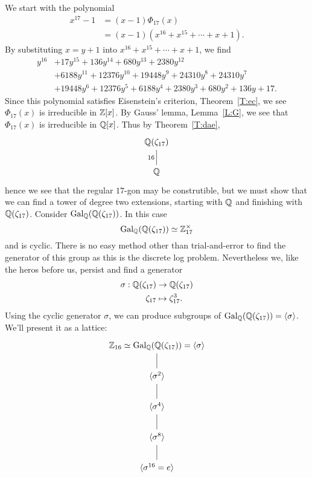 \documentclass{ximera}
\begin{document}
\begin{example}
  We start with the polynomial
  \begin{align*}
    x^{17} -1 &= (x-1) \Phi_{17}(x)\\
    &= (x-1)(x^{16} + x^{15} + \cdots + x+1).
  \end{align*}
  By substituting $x=y+1$ into $x^{16} + x^{15} + \cdots + x+1$, we find
  \begin{align*}
  y^{16} &+17 y^{15}+136 y^{14}+680 y^{13}+2380 y^{12} \\
  &+6188 y^{11}+12376 y^{10}+19448 y^9+24310 y^8+24310 y^7\\
  &+19448 y^6+12376 y^5+6188 y^4+2380 y^3+680 y^2+136 y+17.
  \end{align*}
  Since this polynomial satisfies Eisenstein's criterion,
  Theorem~\ref{T:ec}, we see $\Phi_{17}(x)$ is irreducible in
  $\mathbb Z[x]$. By Gauss' lemma, Lemma~\ref{L:G}, we see that $\Phi_{17}(x)$ is irreducible in
  $\mathbb Q[x]$. Thus by Theorem~\ref{T:dae}, 
  \[
  \begin{tikzcd}
    \Q(\zeta_{17})\\
    \Q\ar[u, -, "16"]
  \end{tikzcd}
  \]
  hence we see that the regular $17$-gon may be construtible, but we
  must show that we can find a tower of degree two extensions,
  starting with $\mathbb Q$ and finishing with $\mathbb Q(\zeta_{17})$.  Consider
  $\operatorname{Gal}_{\mathbb Q}(\mathbb Q(\zeta_{17}))$. In this case
  \[
  \operatorname{Gal}_{\mathbb Q}(\mathbb Q(\zeta_{17}))\simeq \mathbb Z_{17}^\times
  \]
  and is cyclic. There is no easy method other than trial-and-error to
  find the generator of this group as this is the discrete log
  problem. Nevertheless we, like the
  heros before us, persist and find a generator
  \begin{align*}
  \sigma:\mathbb Q(\zeta_{17}) &\to \mathbb Q(\zeta_{17})\\
  \zeta_{17} &\mapsto \zeta_{17}^3.
  \end{align*}
  Using the cyclic generator $\sigma$, we can produce subgroups of
  $\operatorname{Gal}_\mathbb Q(\mathbb Q(\zeta_{17})) = \langle \sigma \rangle$. We'll present it as a
  lattice:
  \[
    \begin{tikzcd}
    \Z_{16}\iso\gal_\Q(\Q(\zeta_{17})) = \< \sigma \>\ar[d,-]\\
    \< \sigma^2\> \ar[d,-]\\
    \<\sigma^4\> \ar[d,-]\\
    \<\sigma^8\> \ar[d,-]\\
    \<\sigma^{16}=e\> 
  \end{tikzcd}
\]
\end{example}
\end{document}
